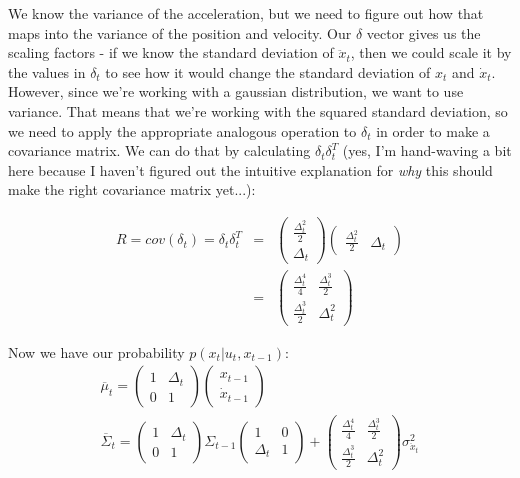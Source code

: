 \documentclass[10pt]{article}
\begin{document}
\begin{enumerate}
\begin{enumerate}
      We know the variance of the acceleration, but we need to figure out how that
      maps into the variance of the position and velocity. Our $\delta$ vector gives
      us the scaling factors - if we know the standard deviation of $\ddot{x}_t$,
      then we could scale it by the values in $\delta_t$ to see how it would change
      the standard deviation of $x_t$ and $\dot{x}_t$. However, since we're working
      with a gaussian distribution, we want to use variance. That means that we're
      working with the squared standard deviation, so we need to apply the
      appropriate analogous operation to $\delta_t$ in order to make a covariance
      matrix. We can do that by calculating $\delta_t \delta_t^T$ (yes, I'm
      hand-waving a bit here because I haven't figured out the intuitive explanation
      for \textit{why} this should make the right covariance matrix yet...):

      \begin{align}
        R = cov\left(\delta_t\right) = \delta_t \delta_t^T &=& 
      \begin{pmatrix}\frac{\Delta_t^2}{2} \\ \Delta_t\end{pmatrix} 
      \begin{pmatrix}\frac{\Delta_t^2}{2} & \Delta_t\end{pmatrix} \\
                                          &=&
        \begin{pmatrix}\frac{\Delta_t^4}{4} & \frac{\Delta_t^3}{2} \\
      \frac{\Delta_t^3}{2} & \Delta_t^2 \end{pmatrix}
      \end{align}

      Now we have our probability $p(x_t | u_t,x_{t-1})$:
      \begin{gather}
      \overline{\mu}_t = \begin{pmatrix}1 & \Delta_t \\ 0 & 1\end{pmatrix}
      \begin{pmatrix}x_{t-1} \\ \dot{x}_{t-1}\end{pmatrix}\\
      \overline{\Sigma}_t = \begin{pmatrix}1 & \Delta_t \\ 0 & 1\end{pmatrix}
        \Sigma_{t-1}
      \begin{pmatrix}1 & 0 \\ \Delta_t & 1\end{pmatrix} + 
        \begin{pmatrix}\frac{\Delta_t^4}{4} & \frac{\Delta_t^3}{2} \\
      \frac{\Delta_t^3}{2} & \Delta_t^2 \end{pmatrix} \sigma_{\ddot{x}_t}^2
      \end{gather}


\end{enumerate}
\end{enumerate}
\end{document}
